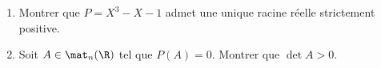 \begin{enonce}
\begin{exercise}[ID={RMS135 E1419},subtitle={IMT MP 2024},tags={},difficulty={}]
\begin{enumerate}
  \item Montrer que $P = X^3 - X - 1$ admet une unique racine réelle strictement positive.
  \item Soit $A \in \mat_n(\R)$ tel que $P(A) = 0$. Montrer que $\det A > 0$.
\end{enumerate}
\end{exercise}
\begin{solution}
\end{solution}
\end{enonce}
